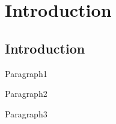 
\chapter{Introduction} %

\label{c1} %


\section{Introduction}
\par Paragraph1
\par Paragraph2
\par Paragraph3
